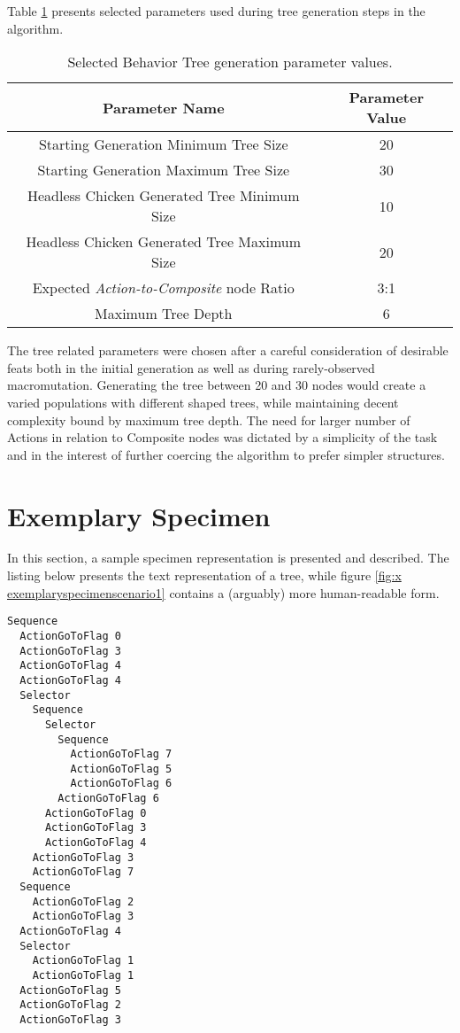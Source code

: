Table \ref{table:x selectedbtparameters} presents selected parameters used during tree generation steps in the algorithm.
\begin{table} [h]
    \centering
    \begin{tabular} {c c}
        \hline \hline
        Parameter Name & Parameter Value \\
        \hline
        Starting Generation Minimum Tree Size & 20 \\
        Starting Generation Maximum Tree Size & 30 \\
        Headless Chicken Generated Tree Minimum Size & 10 \\
        Headless Chicken Generated Tree Maximum Size & 20 \\
        Expected \textit{Action-to-Composite} node Ratio & 3:1 \\
        Maximum Tree Depth & 6
    \end{tabular}
    \caption{Selected Behavior Tree generation parameter values.}
    \label{table:x selectedbtparameters}
\end{table}
The tree related parameters were chosen after a careful consideration of desirable feats both in the initial generation as well as during rarely-observed macromutation. Generating the tree between 20 and 30 nodes would create a varied populations with different shaped trees, while maintaining decent complexity bound by maximum tree depth. The need for larger number of Actions in relation to Composite nodes was dictated by a simplicity of the task and in the interest of further coercing the algorithm to prefer simpler structures.
\section{Exemplary Specimen}
In this section, a sample specimen representation is presented and described. The listing below presents the text representation of a tree, while figure \ref{fig:x exemplaryspecimenscenario1} contains a (arguably) more human-readable form.
\begin{lstlisting}
Sequence
  ActionGoToFlag 0
  ActionGoToFlag 3
  ActionGoToFlag 4
  ActionGoToFlag 4
  Selector
    Sequence
      Selector
        Sequence
          ActionGoToFlag 7
          ActionGoToFlag 5
          ActionGoToFlag 6
        ActionGoToFlag 6
      ActionGoToFlag 0
      ActionGoToFlag 3
      ActionGoToFlag 4
    ActionGoToFlag 3
    ActionGoToFlag 7
  Sequence
    ActionGoToFlag 2
    ActionGoToFlag 3
  ActionGoToFlag 4
  Selector
    ActionGoToFlag 1
    ActionGoToFlag 1
  ActionGoToFlag 5
  ActionGoToFlag 2
  ActionGoToFlag 3
\end{lstlisting}

